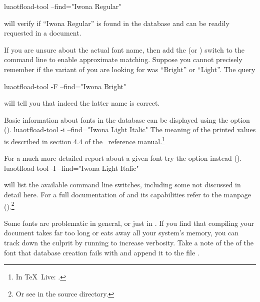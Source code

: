 \beginlisting
  luaotfload-tool  --find="Iwona Regular"
\endlisting

\noindent
will verify if “Iwona Regular” is found in the database and can be
readily requested in a document.

If you are unsure about the actual font name, then add the
 (or ) switch to the command line to enable
approximate matching.
%
Suppose you cannot precisely remember if the variant of
 you are looking for was “Bright” or “Light”.
The query

\beginlisting
  luaotfload-tool  -F --find="Iwona Bright"
\endlisting

\noindent
will tell you that indeed the latter name is correct.

Basic information about fonts in the database can be displayed
using the  option ().
%
\beginlisting
  luaotfload-tool  -i --find="Iwona Light Italic"
\endlisting
%
\noindent
The meaning of the printed values is described in section 4.4 of the
\LuaTeX\ reference manual.\footnote{%
  In \TeX\ Live: .
}

For a much more detailed report about a given font try the
 option instead ().
\beginlisting
  luaotfload-tool  -I --find="Iwona Light Italic"
\endlisting

 will list the available command line
switches, including some not discussed in detail here.
%
For a full documentation of  and its
capabilities refer to the manpage
().\footnote{%
  Or see  in the source directory.
}

\endsubsection

\label{font-blacklist}

Some fonts are problematic in general, or just in \LuaTeX.
%
If you find that compiling your document takes far too long or eats
away all your system’s memory, you can track down the culprit by
running  to increase verbosity.
%
Take a note of the  of the font that database
creation fails with and append it to the file
.


